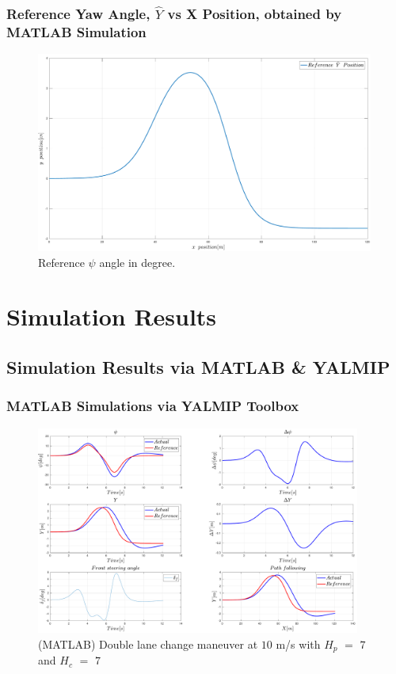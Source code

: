 \documentclass{beamer}
\begin{document}
\begin{frame}
	\frametitle{Reference Yaw Angle, $\hat{Y}$ vs X Position, obtained by MATLAB Simulation}
	\begin{figure}
		\centering
		\includegraphics[width=0.99\textwidth,keepaspectratio]{images/Reference-Y-Position.pdf}
		\caption{Reference $\psi$ angle in degree.}
		\label{fig_06:reference_Y_position}
	\end{figure}
\end{frame}

\section{Simulation Results}
\subsection{Simulation Results via MATLAB \& YALMIP}
\begin{frame}
	\frametitle{MATLAB Simulations via YALMIP Toolbox}
	\begin{figure}
		\centering
		\includegraphics[width=0.95\textwidth,keepaspectratio]{images/Double_Lane_Change_Maneuver_MATLAB_01.pdf}
		\caption{(MATLAB) Double lane change maneuver at $10$ m/s with $H_p$ $=$ $7$ and $H_c$ $=$ $7$}
		\label{fig_07:double_lane_change_maneuver_01}
	\end{figure}
\end{frame}
\end{document}
